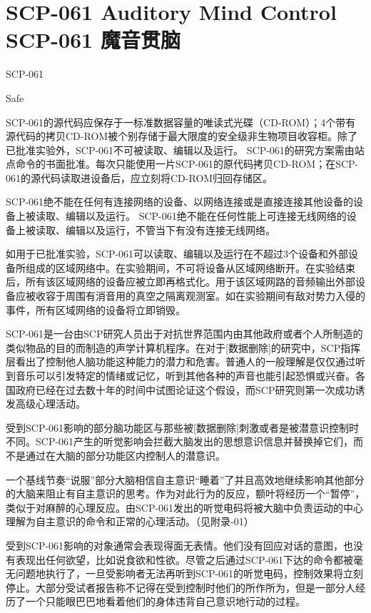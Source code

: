 \chapter[SCP-061 魔音贯脑]{
    SCP-061 Auditory Mind Control\\
    SCP-061 魔音贯脑
}

\label{chap:SCP-061}

SCP-061

Safe

SCP-061的源代码应保存于一标准数据容量的唯读式光碟（CD-ROM）；4个带有源代码的拷贝CD-ROM被个别存储于最大限度的安全级非生物项目收容柜。除了已批准实验外，SCP-061不可被读取、编辑以及运行。 SCP-061的研究方案需由站点命令的书面批准。每次只能使用一片SCP-061的原代码拷贝CD-ROM；在SCP-061的源代码读取进设备后，应立刻将CD-ROM归回存储区。

SCP-061绝不能在任何有连接网络的设备、以网络连接或是直接连接其他设备的设备上被读取、编辑以及运行。 SCP-061绝不能在任何性能上可连接无线网络的设备上被读取、编辑以及运行，不管当下有没有连接无线网络。

如用于已批准实验，SCP-061可以读取、编辑以及运行在不超过3个设备和外部设备所组成的区域网络中。在实验期间，不可将设备从区域网络断开。在实验结束后，所有该区域网络的设备应被立即再格式化。用于该区域网路的音频输出外部设备应被收容于周围有消音用的真空之隔离观测室。如在实验期间有敌对势力入侵的事件，所有区域网络的设备将立即销毁。

SCP-061是一台由SCP研究人员出于对抗世界范围内由其他政府或者个人所制造的类似物品的目的而制造的声学计算机程序。在对于{[}数据删除]的研究中，SCP指挥层看出了控制他人脑功能这种能力的潜力和危害。普通人的一般理解是仅仅通过听到音乐可以引发特定的情绪或记忆，听到其他各种的声音也能引起恐惧或兴奋。各国政府已经在过去数十年的时间中试图论证这个假设，而SCP研究则第一次成功诱发高级心理活动。

受到SCP-061影响的部分脑功能区与那些被{[}数据删除]刺激或者是被潜意识控制时不同。SCP-061产生的听觉影响会拦截大脑发出的思想意识信息并替换掉它们，而不是通过在大脑的部分功能区内控制人的潜意识。

一个基线节奏“说服”部分大脑相信自主意识“睡着”了并且高效地继续影响其他部分的大脑来阻止有自主意识的思考。作为对此行为的反应，额叶将经历一个“暂停”，类似于对麻醉的心理反应。由SCP-061发出的听觉电码将被大脑中负责运动的中心理解为自主意识的命令和正常的心理活动。（见附录-01）

受到SCP-061影响的对象通常会表现得面无表情。他们没有回应对话的意图，也没有表现出任何欲望，比如说食欲和性欲。尽管之后通过SCP-061下达的命令都被毫无问题地执行了，一旦受影响者无法再听到SCP-061的听觉电码，控制效果将立刻停止。大部分受试者报告称不记得在受到控制时他们的所作所为，但是一部分人经历了一个只能眼巴巴地看着他们的身体违背自己意识地行动的过程。

